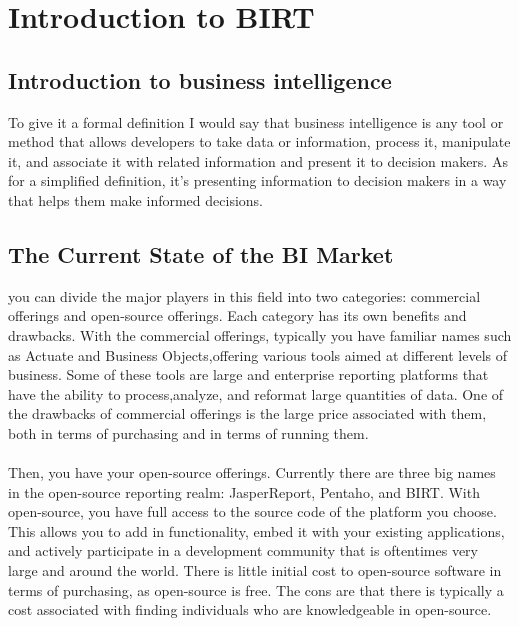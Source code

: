 
\section{Introduction to BIRT}
\label{sec:BIRT_intro}
\subsection{Introduction to business intelligence}

To give it a formal definition I would say that business intelligence is any tool
or method that allows developers to take data or information, process it,
manipulate it, and associate it with related information and present it to
decision makers. As for a simplified definition, it's presenting information to
decision makers in a way that helps them make informed decisions.

\subsection{The Current State of the BI Market}
you can divide the major players in this field into two categories: commercial
offerings and open-source offerings. Each category has its own benefits and
drawbacks. With the commercial offerings, typically you have familiar names such
as Actuate and Business Objects,offering various tools aimed at different levels
of business. Some of these tools are large and enterprise reporting platforms
that have the ability to process,analyze, and reformat large quantities of data.
One of the drawbacks of commercial offerings is the large price associated with
them, both in terms of purchasing and in terms of running them.
\\\\
Then, you have your open-source offerings. Currently there are three big names in
the open-source reporting realm: JasperReport, Pentaho, and BIRT. With
open-source, you have full access to the source code of the platform you choose.
This allows you to add in functionality, embed it with your existing
applications, and actively participate in a development community that is
oftentimes very large and around the world. There is little initial cost to
open-source software in terms of purchasing, as open-source is free. The cons are
that there is typically a cost associated with finding individuals who are
knowledgeable in open-source.

